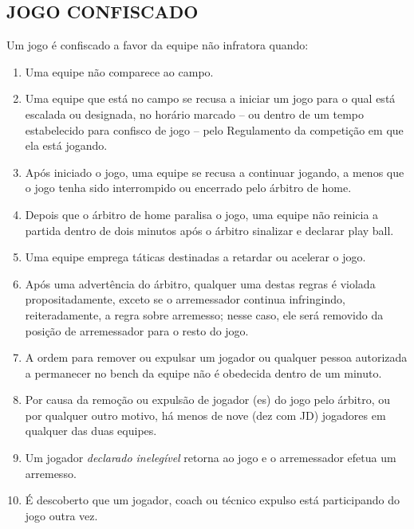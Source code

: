 \begin{multicols}{2}
\subsection{JOGO CONFISCADO}
Um jogo \'e confiscado a favor da equipe n\~ao infratora quando: 

\begin{enumerate}[label=\alph*)]
	\item Uma equipe n\~ao comparece ao campo. 

	\item  Uma equipe que est\'a no campo se recusa a iniciar um jogo para o qual est\'a escalada ou designada, no hor\'ario marcado -- ou dentro de um tempo estabelecido para confisco de jogo -- pelo Regulamento da competi\c{c}\~ao em que ela est\'a jogando. 

	\item  Após iniciado o jogo, uma equipe se recusa a continuar jogando, a menos que o jogo tenha sido interrompido ou encerrado pelo \'arbitro de \gls{home}. 

	\item  Depois que o \'arbitro de \gls{home} paralisa o jogo, uma equipe n\~ao reinicia a partida dentro de dois minutos após o \'arbitro sinalizar e declarar \gls{play ball}. 

	\item  Uma equipe emprega t\'aticas destinadas a retardar ou acelerar o jogo. 

	\item  Após uma advert\^encia do \'arbitro, qualquer uma destas regras \'e violada propositadamente, exceto se o arremessador continua infringindo, reiteradamente, a regra sobre arremesso; nesse caso, ele ser\'a removido da posi\c{c}\~ao de arremessador para o resto do jogo. 

	\item  A ordem para remover ou expulsar um jogador ou qualquer pessoa autorizada a permanecer no \gls{bench} da equipe n\~ao \'e obedecida dentro de um minuto. 

	\item  Por causa da remo\c{c}\~ao ou expuls\~ao de jogador (es) do jogo pelo \'arbitro, ou por qualquer outro motivo, h\'a menos de nove (dez com JD) jogadores em qualquer das duas equipes. 

	\item  Um jogador \textsl{declarado ineleg\'ivel} retorna ao jogo e o arremessador efetua um arremesso. 

	\item  \'E descoberto que um jogador, \gls{coach} ou t\'ecnico expulso est\'a participando do jogo outra vez. 
\end{enumerate}


\end{multicols}
